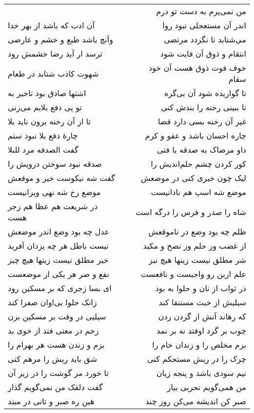 \begin{center}
\begin{longtable}{l p{0.5cm} r}
&&
من نمی‌پرم به دست تو درم
\\
آن ادب که باشد از بهر خدا
&&
اندر آن مستعجلی نبود روا
\\
وآنچ باشد طبع و خشم و عارضی
&&
می‌شتابد تا نگردد مرتضی
\\
ترسد ار آید رضا خشمش رود
&&
انتقام و ذوق آن فایت شود
\\
شهوت کاذب شتابد در طعام
&&
خوف فوت ذوق هست آن خود سقام
\\
اشتها صادق بود تاخیر به
&&
تا گواریده شود آن بی‌گره
\\
تو پی دفع بلایم می‌زنی
&&
تا ببینی رخنه را بندش کنی
\\
تا از آن رخنه برون ناید بلا
&&
غیر آن رخنه بسی دارد قضا
\\
چارهٔ دفع بلا نبود ستم
&&
چاره احسان باشد و عفو و کرم
\\
گفت الصدقه مرد للبلا
&&
داو مرضاک به صدقه یا فتی
\\
صدقه نبود سوختن درویش را
&&
کور کردن چشم حلم‌اندیش را
\\
گفت شه نیکوست خیر و موقعش
&&
لیک چون خیری کنی در موضعش
\\
موضع رخ شه نهی ویرانیست
&&
موضع شه اسپ هم نادانیست
\\
در شریعت هم عطا هم زجر هست
&&
شاه را صدر و فرس را درگه است
\\
عدل چه بود وضع اندر موضعش
&&
ظلم چه بود وضع در ناموقعش
\\
نیست باطل هر چه یزدان آفرید
&&
از غضب وز حلم وز نصح و مکید
\\
خیر مطلق نیست زینها هیچ چیز
&&
شر مطلق نیست زینها هیچ نیز
\\
نفع و ضر هر یکی از موضعست
&&
علم ازین رو واجبست و نافعست
\\
ای بسا زجری که بر مسکین رود
&&
در ثواب از نان و حلوا به بود
\\
زانک حلوا بی‌اوان صفرا کند
&&
سیلیش از خبث مستنقا کند
\\
سیلیی در وقت بر مسکین بزن
&&
که رهاند آنش از گردن زدن
\\
زخم در معنی فتد از خوی بد
&&
چوب بر گرد اوفتد نه بر نمد
\\
بزم و زندن هست هر بهرام را
&&
بزم مخلص را و زندان خام را
\\
شق باید ریش را مرهم کنی
&&
چرک را در ریش مستحکم کنی
\\
تا خورد مر گوشت را در زیر آن
&&
نیم سودی باشد و پنجه زیان
\\
گفت دلقک من نمی‌گویم گذار
&&
من همی‌گویم تحریی بیار
\\
هین ره صبر و تانی در مبند
&&
صبر کن اندیشه می‌کن روز چند
\\

\end{longtable}
\end{center}
